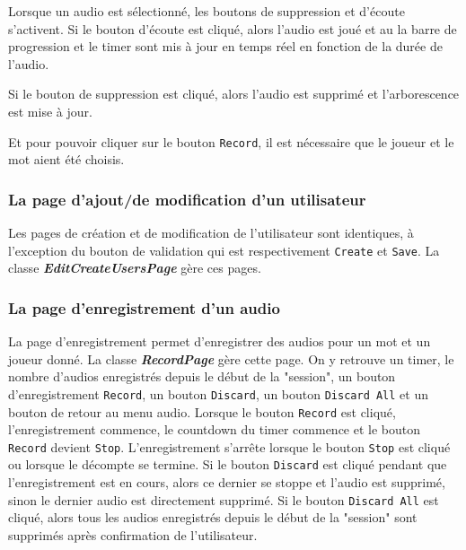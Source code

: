 Lorsque un audio est sélectionné, les boutons de suppression et d'écoute
s'activent. Si le bouton d'écoute est cliqué, alors l'audio est joué et au
la barre de progression et le timer sont mis à jour en temps réel en fonction
de la durée de l'audio.

Si le bouton de suppression est cliqué, alors l'audio est supprimé et l'arborescence
est mise à jour.

Et pour pouvoir cliquer sur le bouton \texttt{Record}, il est nécessaire que le
joueur et le mot aient été choisis.


\subsubsection*{La page d'ajout/de modification d'un utilisateur}
\label{subsubsec:sonVueAjoutModifUtilisateur}

Les pages de création et de modification de l'utilisateur sont identiques, à
l'exception du bouton de validation qui est respectivement \texttt{Create}
et \texttt{Save}. La classe \textbf{\textit{EditCreateUsersPage}} gère ces
pages.

\begin{figure}[!htb]
    \label{fig:CreateOrSaveUserPage}
\end{figure}

\subsubsection*{La page d'enregistrement d'un audio}
\label{subsubsec:sonVueEnregistrementAudio}

La page d'enregistrement permet d'enregistrer des audios pour un mot et un joueur
donné. La classe \textbf{\textit{RecordPage}} gère cette page. On y retrouve un
timer, le nombre d'audios enregistrés depuis le début de la "session", un bouton
d'enregistrement \texttt{Record}, un bouton \texttt{Discard}, un bouton
\texttt{Discard All} et un bouton de retour au menu audio.
Lorsque le bouton \texttt{Record} est cliqué, l'enregistrement commence, le countdown
du timer commence et le bouton \texttt{Record} devient \texttt{Stop}. L'enregistrement
s'arrête lorsque le bouton \texttt{Stop} est cliqué ou lorsque le décompte se termine.
Si le bouton \texttt{Discard} est cliqué pendant que l'enregistrement est en cours,
alors ce dernier se stoppe et l'audio est supprimé, sinon le dernier audio est
directement supprimé.
Si le bouton \texttt{Discard All} est cliqué, alors tous les audios enregistrés
depuis le début de la "session" sont supprimés après confirmation de l'utilisateur.

\begin{figure}[!htb]
    \label{fig:RecordPage}
\end{figure}